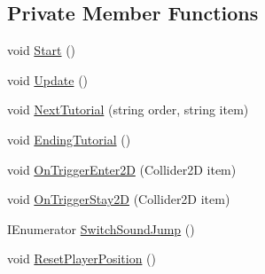 \subsection*{Private Member Functions}
\begin{DoxyCompactItemize}
\item 
void \mbox{\hyperlink{class_tutorial_controller_a5ae5a0517d1a7c8a599146b0c3b2c9eb}{Start}} ()
\item 
void \mbox{\hyperlink{class_tutorial_controller_a10faf69182b1b2364b4a554b01ef63ab}{Update}} ()
\item 
void \mbox{\hyperlink{class_tutorial_controller_a0eba057a98d7f73398c3a6d82ffba746}{Next\+Tutorial}} (string order, string item)
\item 
void \mbox{\hyperlink{class_tutorial_controller_a99ff0d847461d0f626de4741c94bab15}{Ending\+Tutorial}} ()
\item 
void \mbox{\hyperlink{class_tutorial_controller_af54eb070a3f4c68020a32f24c8d29584}{On\+Trigger\+Enter2D}} (Collider2D item)
\item 
void \mbox{\hyperlink{class_tutorial_controller_aee959408bb63b7390577abe6db06e5f1}{On\+Trigger\+Stay2D}} (Collider2D item)
\item 
I\+Enumerator \mbox{\hyperlink{class_tutorial_controller_a668bb94881d2e400dafcebad517a731e}{Switch\+Sound\+Jump}} ()
\item 
void \mbox{\hyperlink{class_tutorial_controller_a4f842bb1692e3c2bd3c73100a3511dac}{Reset\+Player\+Position}} ()
\end{DoxyCompactItemize}
